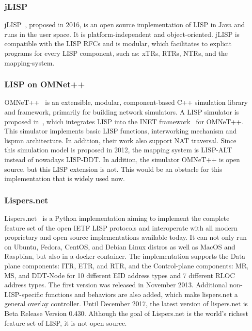 \subsubsection{jLISP}
\label{subsubsec:implementation_jLISP}
jLISP~\cite{stockmayer2016jlisp}, proposed in 2016, is an open source implementation of LISP in Java and runs in the user space. It is platform-independent and object-oriented. jLISP is compatible with the LISP RFCs and is modular, which facilitates to explicit programs for every LISP component, such as: xTRs, RTRs, NTRs, and the mapping-system.

\subsubsection{LISP on OMNet++}
\label{subsubsec:implementation_OMNet}
OMNeT++~\cite{omnetpp} is an extensible, modular, component-based C++ simulation library and framework, primarily for building network simulators. A LISP simulator is proposed in~\cite{klein2012integration}, which integrates LISP into the INET framework~\cite{INET} for OMNeT++. This simulator implements basic LISP functions, interworking mechanism and \acrshort{lispmn} architecture. In addition, their work also support NAT traversal. Since this simulation model is proposed in 2012, the mapping system is LISP-ALT instead of nowadays LISP-DDT. In addition, the simulator OMNeT++ is open source, but this LISP extension is not. This would be an obstacle for this implementation that is widely used now.

\subsubsection{Lispers.net}
\label{subsubsec:implementation_lispers}
Lispers.net~\cite{lispers} is a Python implementation aiming to implement the complete feature set of the open IETF LISP protocols and interoperate with all modern proprietary and open source implementations available today. It can not only run on Ubuntu, Fedora, CentOS, and Debian Linux distros as well as MacOS and Raspbian, but also in a docker container. The implementation supports the Data-plane components: ITR, ETR, and RTR, and the Control-plane components: MR, MS, and DDT-Node for 10 different EID address types and 7 different RLOC address types. The first version was released in November 2013. Additional non-LISP-specific functions and behaviors are also added, which make lispers.net a general overlay controller. Until December  2017, the latest version of lispers.net is Beta Release Version 0.430. Although the goal of Lispers.net is the world's richest feature set of LISP, it is not open source.


